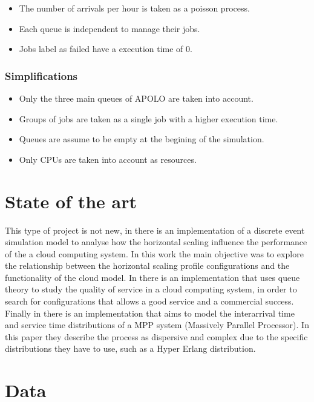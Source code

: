 \documentclass{wscpaperproc}
\begin{document}
\begin{itemize}
    \item The number of arrivals per hour is taken as a poisson process.
    \item Each queue is independent to manage their jobs.
    \item Jobs label as failed have a execution time of 0.
\end{itemize}

\subsubsection{Simplifications}

\begin{itemize}
    \item Only the three main queues of APOLO are taken into account.
    \item Groups of jobs are taken as a single job with a higher execution time.
    \item Queues are assume to be empty at the begining of the simulation.
    \item Only CPUs are taken into account as resources.
\end{itemize}

\section{State of the art}

This type of project is not new, in \cite{article1} there is an implementation
of a discrete event simulation model to analyse how the horizontal scaling
influence the performance of the a cloud computing system. In this work the main
objective was to explore the relationship between the horizontal scaling
profile configurations and the functionality of the cloud model. In
\cite{article2} there is an implementation that uses queue theory to study the
quality of service in a cloud computing system, in order to search for
configurations that allows a good service and a commercial success. Finally in
\cite{article3} there is an implementation that aims to model
the interarrival time and service time distributions of a MPP system (Massively
Parallel Processor). In this paper they describe the process as
dispersive and complex due to the specific distributions they have to use, such
as a Hyper Erlang distribution.

\section{Data}
\end{document}
